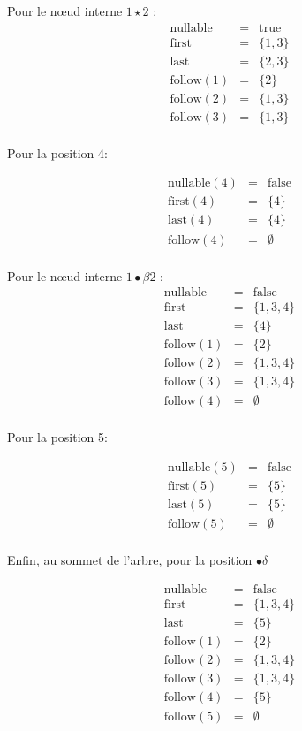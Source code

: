 \documentclass{article}
\begin{document}
Pour le n\oe ud interne $1\star2$ : 
$$\begin{array}{lcl}
\mbox{nullable}&=&\mbox{true}\\
\mbox{first}&=&\{1,3\}\\
\mbox{last}&=&\{2,3\}\\
\mbox{follow}(1)&=&\{2\}\\
\mbox{follow}(2)&=&\{1,3\}\\
\mbox{follow}(3)&=&\{1,3\}\\
\end{array}
$$

Pour la position 4: 

$$\begin{array}{lcl}
\mbox{nullable}(4)&=&\mbox{false}\\
\mbox{first}(4)&=&\{4\}\\
\mbox{last}(4)&=&\{4\}\\
\mbox{follow}(4)&=&\emptyset\\
\end{array}
$$

Pour le n\oe ud interne $1\bullet \beta2$ : 
$$\begin{array}{lcl}
\mbox{nullable}&=&\mbox{false}\\
\mbox{first}&=&\{1,3,4\}\\
\mbox{last}&=&\{4\}\\
\mbox{follow}(1)&=&\{2\}\\
\mbox{follow}(2)&=&\{1,3,4\}\\
\mbox{follow}(3)&=&\{1,3,4\}\\
\mbox{follow}(4)&=&\emptyset\\
\end{array}
$$

Pour la position 5: 

$$\begin{array}{lcl}
\mbox{nullable}(5)&=&\mbox{false}\\
\mbox{first}(5)&=&\{5\}\\
\mbox{last}(5)&=&\{5\}\\
\mbox{follow}(5)&=&\emptyset\\
\end{array}
$$


Enfin, au sommet de l'arbre, pour la position $\bullet \delta$

$$\begin{array}{lcl}
\mbox{nullable}&=&\mbox{false}\\
\mbox{first}&=&\{1,3,4\}\\
\mbox{last}&=&\{5\}\\
\mbox{follow}(1)&=&\{2\}\\
\mbox{follow}(2)&=&\{1,3,4\}\\
\mbox{follow}(3)&=&\{1,3,4\}\\
\mbox{follow}(4)&=&\{5\}\\
\mbox{follow}(5)&=&\emptyset\\
\end{array}
$$
\end{document}
